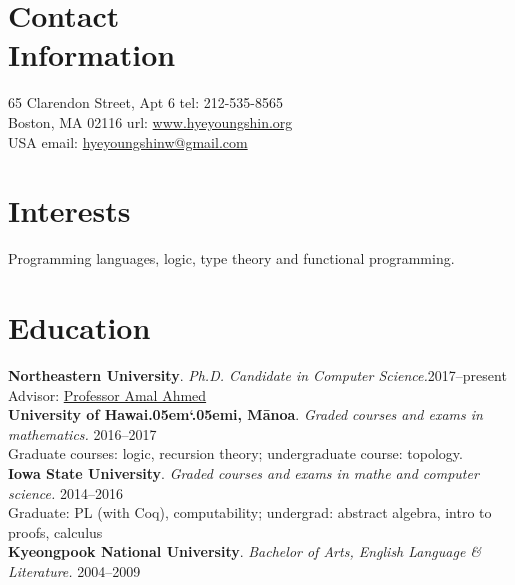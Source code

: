 \documentclass[margin,line]{resume}
\begin{document}
\newcommand{\Hawaii}{Hawai\kern.05em`\kern.05em\relax i}
\newcommand{\Manoa}{M\=anoa}

\begin{resume}

    \section{\mysidestyle Contact\\Information}
     65 Clarendon Street, Apt 6            \hfill tel: 212-535-8565\\
     Boston, MA 02116                 \hfill url: \href{https://hyeyoungshin.github.io/}{www.hyeyoungshin.org}\\
     USA  \hfill             \hfill email:  \href{mailto:hyeyoungshinw@gmail.com}{hyeyoungshinw@gmail.com}

    \section{\mysidestyle Interests}

    Programming languages, logic, type theory and functional programming.
    
    \section{\mysidestyle Education}

    \newcommand\mysmallskip{4pt}
    \newcommand\mymedskip{6pt}
    \newcommand\mybigskip{8pt}

    \textbf{Northeastern University}. \textsl{Ph.D. Candidate in Computer Science.}\hfill 2017--present\\
    Advisor: \href{http://www.ccs.neu.edu/home/amal/}{Professor Amal Ahmed}
    \\[\mymedskip]
    \textbf{University of \Hawaii, \Manoa}. \textsl{Graded courses and exams in mathematics.} \hfill 2016--2017\\  %
    Graduate courses: logic, recursion theory; undergraduate course: topology. %
    \\[\mymedskip]
    \textbf{Iowa State University}. \textsl{Graded courses and exams in mathe and computer science.} \hfill 2014--2016\\
    Graduate: PL {\small (with Coq)}, computability; undergrad: abstract algebra, intro to proofs, calculus %
    \\[\mymedskip] 
    \textbf{Kyeongpook National University}. \textsl{Bachelor of Arts, English Language \& Literature.} \hfill 2004--2009  %
    


\end{resume}
\end{document}
